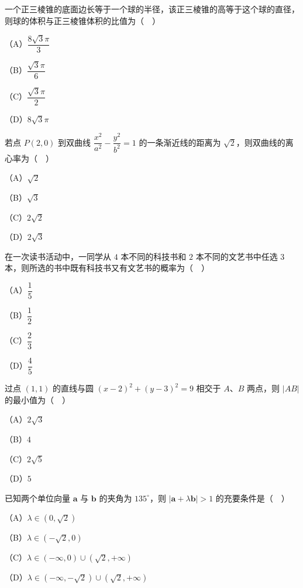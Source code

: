 \begin{question}
一个正三棱锥的底面边长等于一个球的半径，该正三棱锥的高等于这个球的直径，则球的体积与正三棱锥体积的比值为（　）

（A）$\dfrac{8\sqrt3\pi}3$

（B）$\dfrac{\sqrt3\pi}6$

（C）$\dfrac{\sqrt3\pi}2$

（D）$8\sqrt3\pi$

\end{question}
\begin{question}
若点 $P(2,0)$ 到双曲线 $\dfrac{x^2}{a^2}-\dfrac{y^2}{b^2}=1$ 的一条渐近线的距离为 $\sqrt2$，则双曲线的离心率为（　）

（A）$\sqrt2$

（B）$\sqrt3$

（C）$2\sqrt2$

（D）$2\sqrt3$

\end{question}
\begin{question}
在一次读书活动中，一同学从 $4$ 本不同的科技书和 $2$ 本不同的文艺书中任选 $3$ 本，则所选的书中既有科技书又有文艺书的概率为（　）

（A）$\dfrac15$

（B）$\dfrac12$

（C）$\dfrac23$

（D）$\dfrac45$

\end{question}
\begin{question}
过点 $(1,1)$ 的直线与圆 $(x-2)^2+(y-3)^2=9$ 相交于 $A$、$B$ 两点，则 $|AB|$ 的最小值为（　）

（A）$2\sqrt3$

（B）$4$

（C）$2\sqrt5$

（D）$5$

\end{question}
\begin{question}
已知两个单位向量 $\boldsymbol a$ 与 $\boldsymbol b$ 的夹角为 $135^\circ$，则 $|\boldsymbol a+\lambda\boldsymbol b|>1$ 的充要条件是（　）

（A）$\lambda\in(0,\sqrt2)$

（B）$\lambda\in(-\sqrt2,0)$

（C）$\lambda\in(-\infty,0)\cup(\sqrt2,+\infty)$

（D）$\lambda\in(-\infty,-\sqrt2)\cup(\sqrt2,+\infty)$

\end{question}
